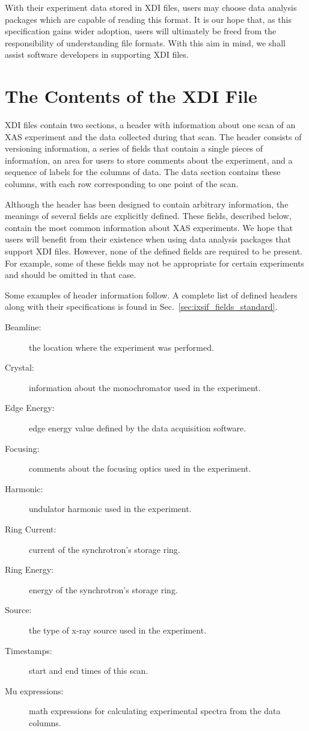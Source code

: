 \documentclass{article}
\newcommand{\xdi}{\textsf{XDI}}
\begin{document}
With their experiment data stored in {\xdi} files, users may choose
data analysis packages which are capable of reading this format.  It
is our hope that, as this specification gains wider adoption, users
will ultimately be freed from the responsibility of understanding file
formats.  With this aim in mind, we shall assist software developers
in supporting {\xdi} files.


\section{The Contents of the XDI File}
\label{sec:contents_ixsif}

{\xdi} files contain two sections, a header with information about one
scan of an XAS experiment and the data collected during that scan.
The header consists of versioning information, a series of fields that
contain a single pieces of information, an area for users to store
comments about the experiment, and a sequence of labels for the
columns of data.  The data section contains these columns, with each
row corresponding to one point of the scan.

Although the header has been designed to contain arbitrary
information, the meanings of several fields are explicitly defined.
These fields, described below, contain the most common information
about XAS experiments.  We hope that users will benefit from their
existence when using data analysis packages that support {\xdi}
files.  However, none of the defined fields are required to be
present.  For example, some of these fields may not be appropriate for
certain experiments and should be omitted in that case.

Some examples of header information follow.  A complete list of
defined headers along with their specifications is found in
Sec.~\ref{sec:ixsif_fields_standard}.

\begin{description}
\item[Beamline:] the location where the experiment was performed.
\item[Crystal:] information about the monochromator used in the experiment.
\item[Edge Energy:] edge energy value defined by the data acquisition software.
\item[Focusing:] comments about the focusing optics used in the experiment.
\item[Harmonic:] undulator harmonic used in the experiment.
\item[Ring Current:] current of the synchrotron's storage ring.
\item[Ring Energy:] energy of the synchrotron's storage ring.
\item[Source:] the type of x-ray source used in the experiment.
\item[Timestamps:] start and end times of this scan.
\item[Mu expressions:] math expressions for calculating experimental
  spectra from the data columns.
\end{description}
\end{document}
